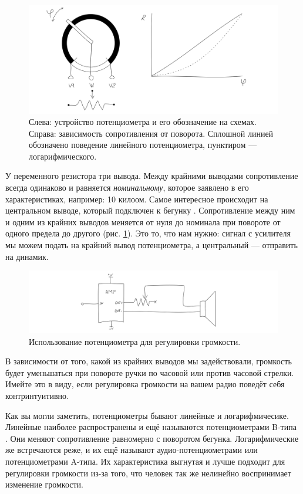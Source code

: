 \begin{figure}
  \centering
  \includegraphics{sketches/pot-internals}
  \caption{Слева: устройство потенциометра и его обозначение на схемах. Справа: зависимость сопротивления от поворота. Сплошной линией обозначено поведение линейного потенциометра, пунктиром — логарифмического.}
  \label{fig:pot-internals}
\end{figure}

У переменного резистора три вывода. Между крайними выводами сопротивление всегда одинаково и равняется \emph{номинальному}, которое заявлено в его характеристиках, например: 10 килоом. Самое интересное происходит на центральном выводе, который подключен к бегунку . Сопротивление между ним и одним из крайних выводов меняется от нуля до номинала при повороте от одного предела до другого (рис. \ref{fig:pot-internals}). Это то, что нам нужно: сигнал с усилителя мы можем подать на крайний вывод потенциометра, а центральный — отправить на динамик.

\begin{figure}
  \centering
  \includegraphics{sketches/pot-volume}
  \caption{Использование потенциометра для регулировки громкости.}
  \label{fig:pot-volume}
\end{figure}

В зависимости от того, какой из крайних выводов мы задействовали, громкость будет уменьшаться при повороте ручки по часовой или против часовой стрелки. Имейте это в виду, если регулировка громкости на вашем радио поведёт себя контринтуитивно.

Как вы могли заметить, потенциометры бывают линейные и логарифмичесике. Линейные наиболее распространены и ещё называются потенциометрами B-типа . Они меняют сопротивление равномерно с поворотом бегунка. Логарифмические же встречаются реже, и их ещё называют аудио-потенциометрами или потенциометрами A-типа. Их характеристика выгнутая и лучше подходит для регулировки громкости из-за того, что человек так же нелинейно воспринимает изменение громкости.

